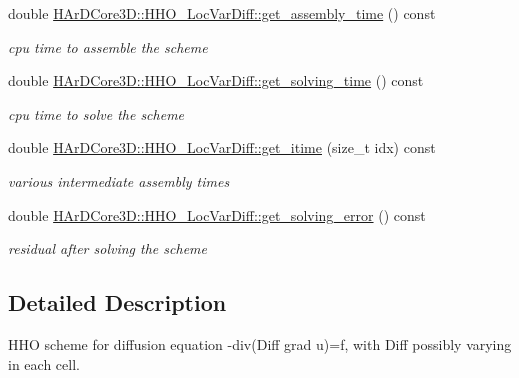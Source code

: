 \begin{DoxyCompactItemize}
\mbox{\label{group__HHO__LocVarDiff_ga4232eab7b9753215b506d5ce701c4f4f}} 
double \hyperlink{group__HHO__LocVarDiff_ga4232eab7b9753215b506d5ce701c4f4f}{H\+Ar\+D\+Core3\+D\+::\+H\+H\+O\+\_\+\+Loc\+Var\+Diff\+::get\+\_\+assembly\+\_\+time} () const
\begin{DoxyCompactList}\small\item\em cpu time to assemble the scheme \end{DoxyCompactList}\item 
\mbox{\label{group__HHO__LocVarDiff_ga10971b2952ab54d336127a43f5ed9b29}} 
double \hyperlink{group__HHO__LocVarDiff_ga10971b2952ab54d336127a43f5ed9b29}{H\+Ar\+D\+Core3\+D\+::\+H\+H\+O\+\_\+\+Loc\+Var\+Diff\+::get\+\_\+solving\+\_\+time} () const
\begin{DoxyCompactList}\small\item\em cpu time to solve the scheme \end{DoxyCompactList}\item 
\mbox{\label{group__HHO__LocVarDiff_gae66d0e79903e2ca077ff2515c20d7d2e}} 
double \hyperlink{group__HHO__LocVarDiff_gae66d0e79903e2ca077ff2515c20d7d2e}{H\+Ar\+D\+Core3\+D\+::\+H\+H\+O\+\_\+\+Loc\+Var\+Diff\+::get\+\_\+itime} (size\+\_\+t idx) const
\begin{DoxyCompactList}\small\item\em various intermediate assembly times \end{DoxyCompactList}\item 
\mbox{\label{group__HHO__LocVarDiff_ga22542468093ee4e8e24d8c0a27946f8f}} 
double \hyperlink{group__HHO__LocVarDiff_ga22542468093ee4e8e24d8c0a27946f8f}{H\+Ar\+D\+Core3\+D\+::\+H\+H\+O\+\_\+\+Loc\+Var\+Diff\+::get\+\_\+solving\+\_\+error} () const
\begin{DoxyCompactList}\small\item\em residual after solving the scheme \end{DoxyCompactList}\end{DoxyCompactItemize}


\subsection{Detailed Description}
H\+HO scheme for diffusion equation -\/div(Diff grad u)=f, with Diff possibly varying in each cell. 



